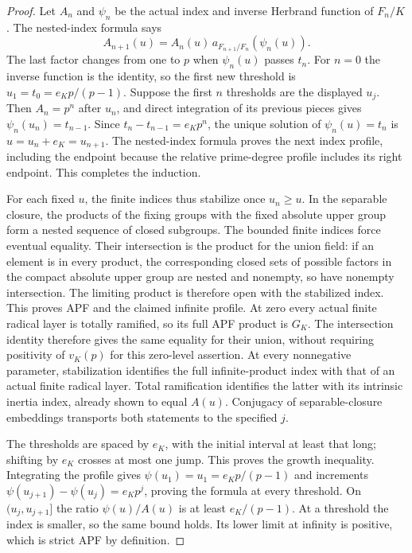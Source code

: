 \begin{proof}
Let $A_n$ and $\psi_n$ be the actual index and inverse Herbrand
function of $F_n/K$. The nested-index formula says
\[
 A_{n+1}(u)=A_n(u)\,
  a_{F_{n+1}/F_n}(\psi_n(u)).
\]
The last factor changes from one to $p$ when $\psi_n(u)$ passes
$t_n$. For $n=0$ the inverse function is the identity, so the
first new threshold is $u_1=t_0=e_Kp/(p-1)$.
Suppose the first $n$ thresholds are the displayed $u_j$.
Then $A_n=p^n$ after $u_n$, and direct integration of its
previous pieces gives $\psi_n(u_n)=t_{n-1}$.
Since $t_n-t_{n-1}=e_Kp^n$, the unique solution of
$\psi_n(u)=t_n$ is $u=u_n+e_K=u_{n+1}$.
The nested-index formula proves the next index profile, including
the endpoint because the relative prime-degree profile includes
its right endpoint. This completes the induction.

For each fixed $u$, the finite indices thus stabilize once
$u_n\geq u$. In the separable closure, the products of the
fixing groups with the fixed absolute upper group form a nested
sequence of closed subgroups. The bounded finite indices force
eventual equality. Their intersection is the product for the
union field: if an element is in every product, the corresponding
closed sets of possible factors in the compact absolute upper
group are nested and nonempty, so have nonempty intersection.
The limiting product is therefore open with the stabilized index.
This proves APF and the claimed infinite profile.
At zero every actual finite radical layer is totally ramified,
so its full APF product is $G_K$. The intersection identity
therefore gives the same equality for their union, without
requiring positivity of $v_K(p)$ for this zero-level assertion.
At every nonnegative parameter, stabilization identifies the
full infinite-product index with that of an actual finite
radical layer. Total ramification identifies the latter with
its intrinsic inertia index, already shown to equal $A(u)$.
Conjugacy of separable-closure embeddings transports both
statements to the specified $j$.

The thresholds are spaced by $e_K$, with the initial interval
at least that long; shifting by $e_K$ crosses at most one jump.
This proves the growth inequality. Integrating the profile gives
$\psi(u_1)=u_1=e_Kp/(p-1)$ and increments
$\psi(u_{j+1})-\psi(u_j)=e_Kp^j$, proving the formula at every
threshold. On $(u_j,u_{j+1}]$ the ratio $\psi(u)/A(u)$ is at
least $e_K/(p-1)$. At a threshold the index is smaller, so the
same bound holds. Its lower limit at infinity is positive,
which is strict APF by definition.
\end{proof}

